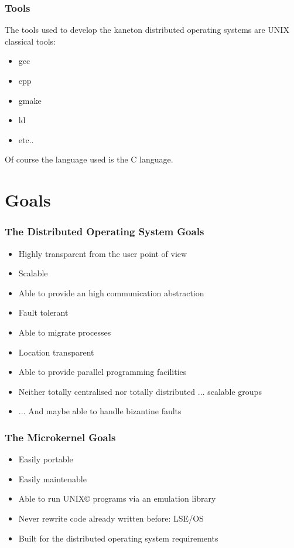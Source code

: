 \documentclass[8pt]{beamer}
\newcommand{\nl}[0]{\vspace{0.4cm}}
\begin{document}

\begin{frame}
  \frametitle{Tools}

  The tools used to develop the kaneton distributed operating systems
  are UNIX classical tools:

  \begin{itemize}[<+->]
    \item
      gcc
    \item
      cpp
    \item
      gmake
    \item
      ld
    \item
      etc..
  \end{itemize}

  \nl

  Of course the language used is the C language.
\end{frame}

%
%

\section{Goals}


\begin{frame}
  \frametitle{The Distributed Operating System Goals}

  \begin{itemize}[<+->]
    \item
      Highly transparent from the user point of view
    \item
      Scalable
    \item
      Able to provide an high communication abstraction
    \item
      Fault tolerant
    \item
      Able to migrate processes
    \item
      Location transparent
    \item
      Able to provide parallel programming facilities
    \item
      Neither totally centralised nor totally distributed ...
      scalable groups
    \item
      ... And maybe able to handle bizantine faults
  \end{itemize}
\end{frame}


\begin{frame}
  \frametitle{The Microkernel Goals}

  \begin{itemize}[<+->]
    \item
      Easily portable
    \item
      Easily maintenable
    \item
      Able to run UNIX{\scriptsize \copyright} programs via
      an emulation library
    \item
      Never rewrite code already written before: LSE/OS
    \item
      Built for the distributed operating system requirements
  \end{itemize}
\end{frame}
\end{document}
